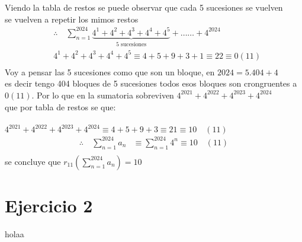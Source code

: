 \documentclass[a4paper]{article}
\begin{document}
Viendo la tabla de restos se puede observar que cada 5 sucesiones se vuelven \\
se vuelven a repetir los mimos restos\\
\begin{align*}
&\therefore \quad \sum_{n=1}^{2024} \underbrace{4^1 + 4^2 + 4^3 + 4^4 + 4^5}_{\text{5 sucesiones}}  + \ldots \ldots  
+ 4^{2024} \\ 
&4^1 + 4^2 + 4^3 + 4^4 + 4^5 \equiv 4 + 5 + 9 + 3 + 1 \equiv 22 \equiv 0 (11) \\
\end{align*}
Voy a pensar las 5 sucesiones como que son un bloque, en $2024 = 5.404 + 4$ \\
es decir tengo 404 bloques de 5 sucesiones todos esos bloques son crongruentes a $0 (11)$.
Por lo que en la sumatoria sobreviven $4^{2021} + 4^{2022} + 4^{2023} + 4^{2024}$ \\
que por tabla de restos se que: \\ \\ $4^{2021} + 4^{2022} + 4^{2023} + 4^{2024} \equiv 4 + 5
+ 9 + 3 \equiv 21 \equiv 10 \quad (11)$ \\
\begin{align*}
\therefore \quad \sum_{n=1}^{2024} a_n &\equiv \sum_{n=1}^{2024} 4^n \equiv 10 \quad (11) \\ 
\end{align*}
se concluye que  $r_{11}(\sum_{n=1}^{2024} a_n) = 10$

\section{Ejercicio 2}
holaa
\end{document}
